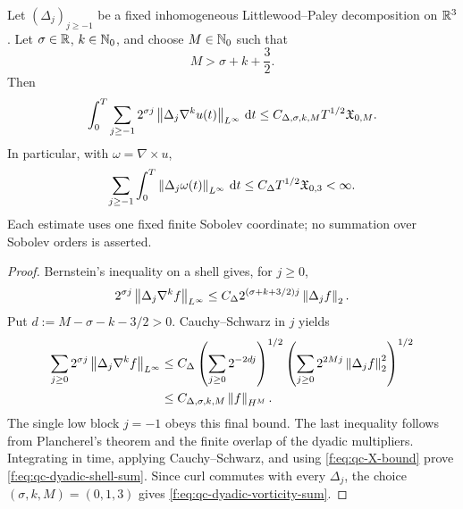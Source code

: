 \begin{proposition}
\label{f:prop:qc-dyadic-shell-sums}
Let \((\Delta_j)_{j\ge-1}\) be a fixed inhomogeneous
Littlewood--Paley decomposition on \(\mathbb R^3\).  Let
\(\sigma\in\mathbb R\), \(k\in\mathbb N_0\), and choose \(M\in\mathbb N_0\) such that
\begin{equation}
 M>\sigma+k+\frac32.
 \label{f:eq:qc-dyadic-order-condition}
\end{equation}
Then
\begin{equation}
 \int_0^T\sum_{j\ge-1}2^{\sigma j}
 \left\lVert \Delta_j\nabla^ku(t)\right\rVert_{L^\infty}\,\mathrm d t
 \le C_{\Delta,\sigma,k,M}T^{1/2}\mathfrak X_{0,M}.
 \label{f:eq:qc-dyadic-shell-sum}
\end{equation}
In particular, with \(\omega=\nabla\times u\),
\begin{equation}
 \sum_{j\ge-1}\int_0^T
 \left\lVert \Delta_j\omega(t)\right\rVert_{L^\infty}\,\mathrm d t
 \le C_\Delta T^{1/2}\mathfrak X_{0,3}<\infty.
 \label{f:eq:qc-dyadic-vorticity-sum}
\end{equation}
Each estimate uses one fixed finite Sobolev coordinate; no summation over
Sobolev orders is asserted.
\end{proposition}

\begin{proof}
Bernstein's inequality on a shell gives, for \(j\ge0\),
\[
 2^{\sigma j}\left\lVert \Delta_j\nabla^kf\right\rVert_{L^\infty}
 \le C_\Delta 2^{(\sigma+k+3/2)j}\left\lVert \Delta_jf\right\rVert_2.
\]
Put \(d:=M-\sigma-k-3/2>0\).  Cauchy--Schwarz in \(j\) yields
\begin{align*}
 \sum_{j\ge0}2^{\sigma j}
 \left\lVert \Delta_j\nabla^kf\right\rVert_{L^\infty}
 &\le C_\Delta
 \left(\sum_{j\ge0}2^{-2dj}\right)^{1/2}
 \left(\sum_{j\ge0}2^{2Mj}\left\lVert \Delta_jf\right\rVert_2^2\right)^{1/2}\\
 &\le C_{\Delta,\sigma,k,M}\left\lVert f\right\rVert_{H^M}.
\end{align*}
The single low block \(j=-1\) obeys this final bound.  The last
inequality follows from Plancherel's theorem and the finite overlap of the
dyadic multipliers.  Integrating in time, applying Cauchy--Schwarz, and using
\eqref{f:eq:qc-X-bound} prove \eqref{f:eq:qc-dyadic-shell-sum}.  Since curl
commutes with every \(\Delta_j\), the choice
\((\sigma,k,M)=(0,1,3)\) gives
\eqref{f:eq:qc-dyadic-vorticity-sum}.
\end{proof}

